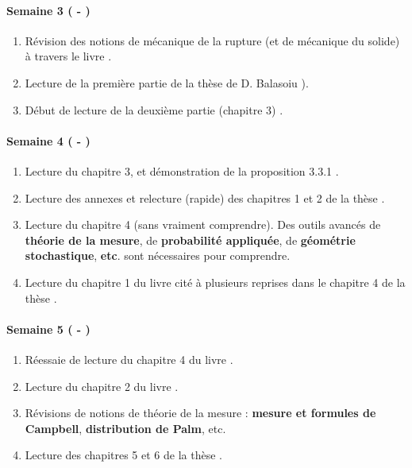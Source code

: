 \paragraph{Semaine 3 ( - )} 
\begin{enumerate}
    \item Révision des notions de mécanique de la rupture (et de mécanique du solide) à travers le livre \parencite{gross2017fracture}.
    \item Lecture de la première partie de la thèse de D. Balasoiu \parencite{balasoiu2020halthesis}).
    \item Début de lecture de la deuxième partie (chapitre 3) \parencite{balasoiu2020halthesis}.
\end{enumerate}
  

\paragraph{Semaine 4 ( - )} 
\begin{enumerate}
  \item Lecture du chapitre 3, et démonstration de la proposition 3.3.1 \parencite[p.93]{balasoiu2020halthesis}.
  \item Lecture des annexes et relecture (rapide) des chapitres 1 et 2 de la thèse \parencite{balasoiu2020halthesis}.
  \item Lecture du chapitre 4 (sans vraiment comprendre). Des outils avancés de \textbf{théorie de la mesure}, de \textbf{probabilité appliquée}, de \textbf{géométrie stochastique}, \textbf{etc}. sont nécessaires pour comprendre.
  \item Lecture du chapitre 1 du livre \parencite{chiu2013stochastic} cité à plusieurs reprises dans le chapitre 4 de la thèse \parencite{balasoiu2020halthesis}. 
\end{enumerate}

\paragraph{Semaine 5 ( - )} 
\begin{enumerate}
    \item Réessaie de lecture du chapitre 4 du livre \parencite{balasoiu2020halthesis}.
    \item Lecture du chapitre 2 du livre \parencite{chiu2013stochastic}.
    \item Révisions de notions de théorie de la mesure : \textbf{mesure et formules de Campbell}, \textbf{distribution de Palm}, etc.
    \item Lecture des chapitres 5 et 6 de la thèse \parencite{balasoiu2020halthesis}.
\end{enumerate}
  

